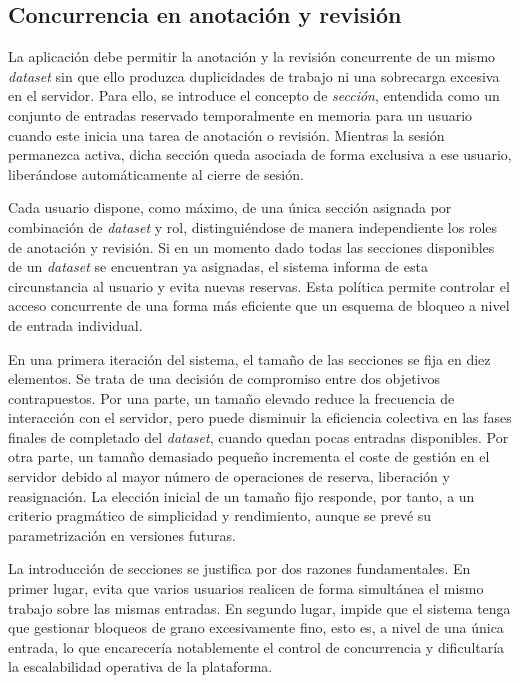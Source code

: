 \subsection{Concurrencia en anotación y revisión}

La aplicación debe permitir la anotación y la revisión concurrente de un mismo
\textit{dataset} sin que ello produzca duplicidades de trabajo ni una
sobrecarga excesiva en el servidor. Para ello, se introduce el concepto de
\textit{sección}, entendida como un conjunto de entradas reservado
temporalmente en memoria para un usuario cuando este inicia una tarea de
anotación o revisión. Mientras la sesión permanezca activa, dicha sección queda
asociada de forma exclusiva a ese usuario, liberándose automáticamente al
cierre de sesión.

Cada usuario dispone, como máximo, de una única sección asignada por
combinación de \textit{dataset} y rol, distinguiéndose de manera independiente
los roles de anotación y revisión. Si en un momento dado todas las secciones
disponibles de un \textit{dataset} se encuentran ya asignadas, el sistema
informa de esta circunstancia al usuario y evita nuevas reservas. Esta política
permite controlar el acceso concurrente de una forma más eficiente que un
esquema de bloqueo a nivel de entrada individual.

En una primera iteración del sistema, el tamaño de las secciones se fija en
diez elementos. Se trata de una decisión de compromiso entre dos objetivos
contrapuestos. Por una parte, un tamaño elevado reduce la frecuencia de
interacción con el servidor, pero puede disminuir la eficiencia colectiva en
las fases finales de completado del \textit{dataset}, cuando quedan pocas
entradas disponibles. Por otra parte, un tamaño demasiado pequeño incrementa el
coste de gestión en el servidor debido al mayor número de operaciones de
reserva, liberación y reasignación. La elección inicial de un tamaño fijo
responde, por tanto, a un criterio pragmático de simplicidad y rendimiento,
aunque se prevé su parametrización en versiones futuras.

La introducción de secciones se justifica por dos razones fundamentales. En
primer lugar, evita que varios usuarios realicen de forma simultánea el mismo
trabajo sobre las mismas entradas. En segundo lugar, impide que el sistema
tenga que gestionar bloqueos de grano excesivamente fino, esto es, a nivel de
una única entrada, lo que encarecería notablemente el control de concurrencia y
dificultaría la escalabilidad operativa de la plataforma.

